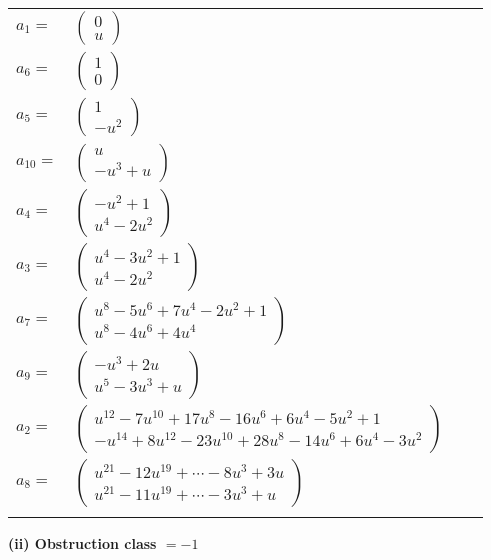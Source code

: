 \documentclass[1p]{elsarticle_modified}
\theoremstyle{definition}
\begin{document}
\begin{tabular}{m{7pt} m{180pt} m{7pt} m{180pt} }
\flushright $a_{1}=$&$\begin{pmatrix}0\\u\end{pmatrix}$ \\
\flushright $a_{6}=$&$\begin{pmatrix}1\\0\end{pmatrix}$ \\
\flushright $a_{5}=$&$\begin{pmatrix}1\\- u^2\end{pmatrix}$ \\
\flushright $a_{10}=$&$\begin{pmatrix}u\\- u^3+u\end{pmatrix}$ \\
\flushright $a_{4}=$&$\begin{pmatrix}- u^2+1\\u^4-2 u^2\end{pmatrix}$ \\
\flushright $a_{3}=$&$\begin{pmatrix}u^4-3 u^2+1\\u^4-2 u^2\end{pmatrix}$ \\
\flushright $a_{7}=$&$\begin{pmatrix}u^8-5 u^6+7 u^4-2 u^2+1\\u^8-4 u^6+4 u^4\end{pmatrix}$ \\
\flushright $a_{9}=$&$\begin{pmatrix}- u^3+2 u\\u^5-3 u^3+u\end{pmatrix}$ \\
\flushright $a_{2}=$&$\begin{pmatrix}u^{12}-7 u^{10}+17 u^8-16 u^6+6 u^4-5 u^2+1\\- u^{14}+8 u^{12}-23 u^{10}+28 u^8-14 u^6+6 u^4-3 u^2\end{pmatrix}$ \\
\flushright $a_{8}=$&$\begin{pmatrix}u^{21}-12 u^{19}+\cdots-8 u^3+3 u\\u^{21}-11 u^{19}+\cdots-3 u^3+u\end{pmatrix}$\\&\end{tabular}
\flushleft \textbf{(ii) Obstruction class $= -1$}\\~\\
\end{document}
